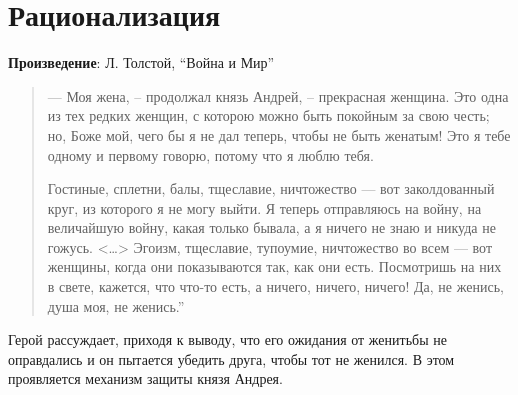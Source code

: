 \section{Рационализация}

\textbf{Произведение}: Л. Толстой, “Война и Мир”

\begin{quote}
    --- Моя жена, – продолжал князь Андрей, – прекрасная женщина. 
    Это одна из тех редких женщин, 
    с которою можно быть покойным за свою честь; 
    но, Боже мой, чего бы я не дал теперь, чтобы не быть женатым! 
    Это я тебе одному и первому говорю, 
    потому что я люблю тебя.
    
    Гостиные, сплетни, балы, тщеславие, ничтожество — вот заколдованный круг, из которого я не могу выйти. Я теперь отправляюсь на войну, на величайшую войну, какая только бывала, а я ничего не знаю и никуда не гожусь. <…> Эгоизм, тщеславие, тупоумие, ничтожество во всем — вот женщины, когда они показываются так, как они есть. Посмотришь на них в свете, кажется, что что-то есть, а ничего, ничего, ничего! Да, не женись, душа моя, не женись.”
\end{quote}

Герой рассуждает, приходя к выводу, что его ожидания от женитьбы не оправдались и он пытается убедить друга, чтобы тот не женился. В этом проявляется механизм защиты князя Андрея.
